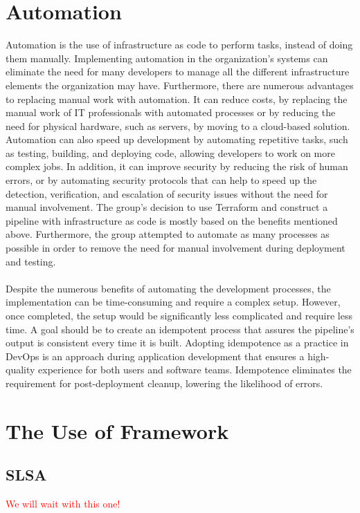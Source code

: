 \section{Automation}
Automation is the use of \gls{infrastructure as code} to perform tasks, instead of doing them manually. Implementing automation in the organization's systems can eliminate the need for many developers to manage all the different infrastructure elements the organization may have. Furthermore, there are numerous advantages to replacing manual work with automation. It can reduce costs, by replacing the manual work of IT professionals with automated processes or by reducing the need for physical hardware, such as servers, by moving to a cloud-based solution. Automation can also speed up development by automating repetitive tasks, such as testing, building, and deploying code, allowing developers to work on more complex jobs. In addition, it can improve security by reducing the risk of human errors, or by automating security protocols that can help to speed up the detection, verification, and escalation of security issues without the need for manual involvement. The group's decision to use Terraform and construct a pipeline with \gls{infrastructure as code} is mostly based on the benefits mentioned above. Furthermore, the group attempted to automate as many processes as possible in order to remove the need for manual involvement during deployment and testing. \cite{automation} \cite{automationredhat}
\\~\\
Despite the numerous benefits of automating the development processes, the implementation can be time-consuming and require a complex setup. However, once completed, the setup would be significantly less complicated and require less time. A goal should be to create an idempotent process that assures the pipeline's output is consistent every time it is built. Adopting idempotence as a practice in DevOps is an approach during application development that ensures a high-quality experience for both users and software teams. Idempotence eliminates the requirement for post-deployment cleanup, lowering the likelihood of errors. \cite{idempotent}

\section{The Use of Framework}
\subsection{SLSA}
\textcolor{red}{We will wait with this one!}
